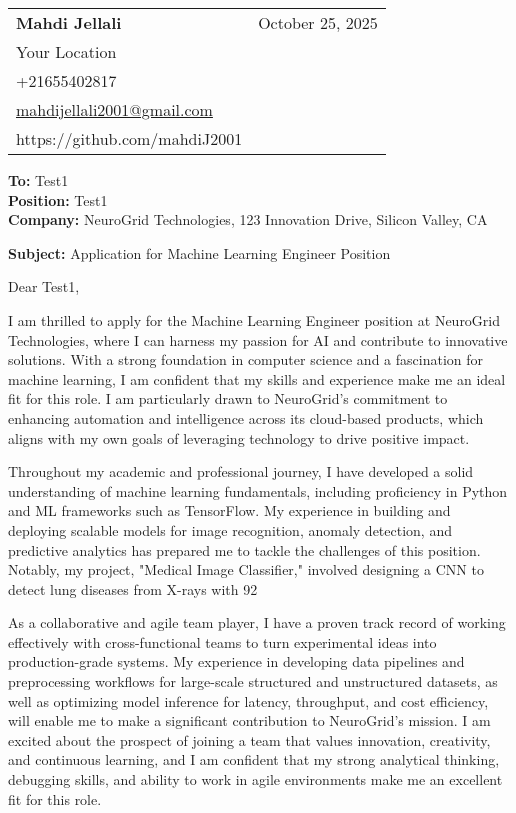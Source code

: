 \documentclass[letterpaper,11pt]{article}
\makeatletter
\newcommand{\letterHeading}[5]{
    \begin{tabular*}{\textwidth}{l@{\extracolsep{\fill}}r}
    \textbf{\Large #1} & #5 \\  %
    #2 & \\
    #3 & \\
    #4 & \\
    \end{tabular*}
    \vspace{15pt}
}
\newcommand{\letterRecipient}[3]{
    \textbf{\large To:} #1 \\
    \textbf{\large Position:} #2 \\
    \textbf{\large Company:} #3 \\
    \vspace{12pt}
}
\newcommand{\letterSubject}[1]{
    \textbf{\large Subject:} #1 \\
    \vspace{15pt}
}
\makeatother
\begin{document}
    \letterHeading
    {Mahdi Jellali}
    {Your Location}
    {+21655402817 \\ \href{mailto:mahdijellali2001@gmail.com}{mahdijellali2001@gmail.com}}
    {https://github.com/mahdiJ2001}
    {October 25, 2025}

    \letterRecipient
    {Test1}
    {Test1}
    {NeuroGrid Technologies, 123 Innovation Drive, Silicon Valley, CA}

    \letterSubject{Application for Machine Learning Engineer Position}

    Dear Test1,

    I am thrilled to apply for the Machine Learning Engineer position at NeuroGrid Technologies, where I can harness my passion for AI and contribute to innovative solutions. With a strong foundation in computer science and a fascination for machine learning, I am confident that my skills and experience make me an ideal fit for this role. I am particularly drawn to NeuroGrid's commitment to enhancing automation and intelligence across its cloud-based products, which aligns with my own goals of leveraging technology to drive positive impact.

    Throughout my academic and professional journey, I have developed a solid understanding of machine learning fundamentals, including proficiency in Python and ML frameworks such as TensorFlow. My experience in building and deploying scalable models for image recognition, anomaly detection, and predictive analytics has prepared me to tackle the challenges of this position. Notably, my project, "Medical Image Classifier," involved designing a CNN to detect lung diseases from X-rays with 92%

    As a collaborative and agile team player, I have a proven track record of working effectively with cross-functional teams to turn experimental ideas into production-grade systems. My experience in developing data pipelines and preprocessing workflows for large-scale structured and unstructured datasets, as well as optimizing model inference for latency, throughput, and cost efficiency, will enable me to make a significant contribution to NeuroGrid's mission. I am excited about the prospect of joining a team that values innovation, creativity, and continuous learning, and I am confident that my strong analytical thinking, debugging skills, and ability to work in agile environments make me an excellent fit for this role.
\end{document}
